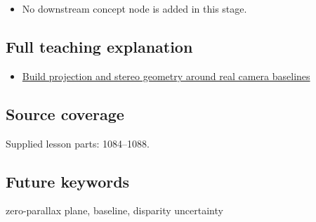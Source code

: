 \begin{itemize}
\tightlist
\item
  No downstream concept node is added in this stage.
\end{itemize}

\subsection{Full teaching explanation}\label{appendix-0976e86e5b9f-full-teaching-explanation}

\begin{itemize}
\tightlist
\item
  \hyperref[02-foundations-ii-ch035-build-projection-and-stereo-geometry-around-real-camera-baselines]{Build projection and stereo geometry around real camera baselines}
\end{itemize}

\subsection{Source coverage}\label{appendix-0976e86e5b9f-source-coverage}

Supplied lesson parts: 1084--1088.

\subsection{Future keywords}\label{appendix-0976e86e5b9f-future-keywords}

zero-parallax plane, baseline, disparity uncertainty
